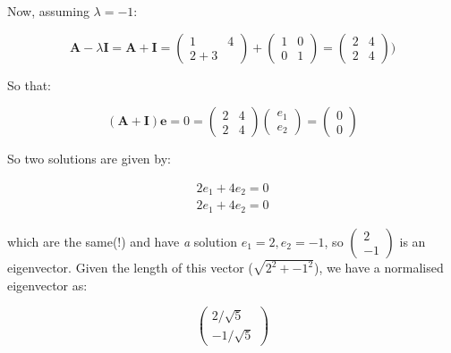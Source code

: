 \documentclass{article}
\begin{document}
\begin{enumerate}
\begin{itemize}
Now, assuming $\lambda=-1$:

\begin{displaymath}
\boldsymbol{A} - \lambda \boldsymbol{I} = \boldsymbol{A}+\boldsymbol{I} = 
  \left( \begin{array}{rr} 1 & 4 \\ 2 + 3 \end{array} \right) + 
  \left( \begin{array}{rr} 1 & 0 \\ 0 & 1 \end{array} \right) = 
  \left( \begin{array}{rr} 2 & 4 \\ 2 & 4 \end{array} \right))
\end{displaymath}

So that:

\begin{displaymath}
(\boldsymbol{A} + \boldsymbol{I}) \boldsymbol{e} = 0 =
  \left( \begin{array}{rr} 2 & 4 \\ 2 & 4 \end{array} \right)
  \left( \begin{array}{r} e_{1} \\ e_{2} \end{array} \right) =
  \left( \begin{array}{r} 0 \\ 0 \end{array} \right)
\end{displaymath}

So two solutions are given by:

\begin{eqnarray*}
2 e_{1} + 4 e_{2} = 0\\
2 e_{1} + 4 e_{2} = 0
\end{eqnarray*}

which are the same(!) and have \emph{a} solution $e_{1} = 2, e_{2} = -1$, so 
$\left( \begin{array}{r} 2 \\ -1 \end{array} \right)$ is an eigenvector.   Given the length of this vector ($\sqrt{2^{2} + -1^{2}}$), we have a normalised eigenvector as:

\begin{displaymath}
\left( \begin{array}{r} 2/\sqrt{5} \\ -1/\sqrt{5} \end{array} \right)
\end{displaymath}


\end{itemize}
\end{enumerate}
\end{document}

